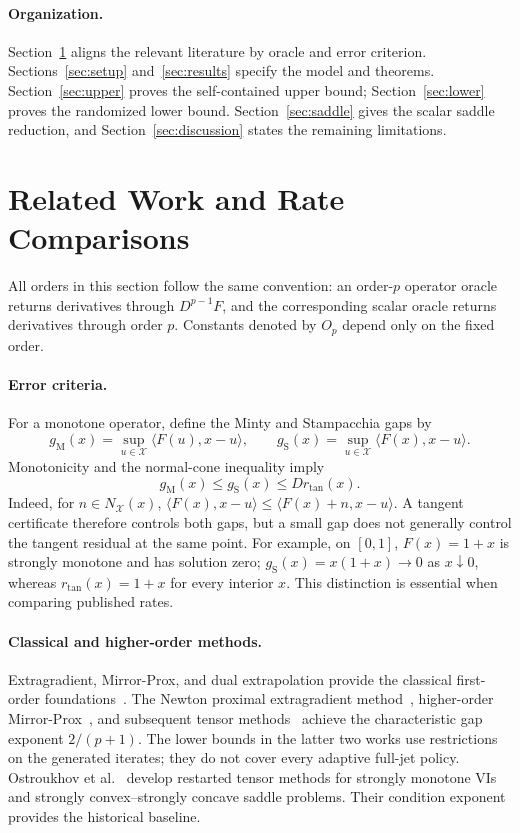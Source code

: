 \documentclass[11pt]{article}
\numberwithin{equation}{section}
\theoremstyle{definition}
\theoremstyle{remark}
\begin{document}
\paragraph{Organization.}
Section~\ref{sec:related} aligns the relevant literature by oracle and
error criterion. Sections~\ref{sec:setup} and~\ref{sec:results} specify
the model and theorems. Section~\ref{sec:upper} proves the self-contained
upper bound; Section~\ref{sec:lower} proves the randomized lower bound.
Section~\ref{sec:saddle} gives the scalar saddle reduction, and
Section~\ref{sec:discussion} states the remaining limitations.

\section{Related Work and Rate Comparisons}\label{sec:related}
All orders in this section follow the same convention: an order-$p$
operator oracle returns derivatives through $D^{p-1}F$, and the
corresponding scalar oracle returns derivatives through order $p$.
Constants denoted by $O_p$ depend only on the fixed order.

\paragraph{Error criteria.}
For a monotone operator, define the Minty and Stampacchia gaps by
\[
g_{\mathrm M}(x)=\sup_{u\in\mathcal X}\langle F(u),x-u\rangle,
\qquad
g_{\mathrm S}(x)=\sup_{u\in\mathcal X}\langle F(x),x-u\rangle.
\]
Monotonicity and the normal-cone inequality imply
\begin{equation}\label{eq:gap-comparison}
g_{\mathrm M}(x)\le g_{\mathrm S}(x)\le D r_{\mathrm{tan}}(x).
\end{equation}
Indeed, for $n\in N_{\mathcal X}(x)$,
$\langle F(x),x-u\rangle\le\langle F(x)+n,x-u\rangle$.
A tangent certificate therefore controls both gaps, but a small gap does
not generally control the tangent residual at the same point. For example,
on $[0,1]$, $F(x)=1+x$ is strongly monotone and has solution zero;
$g_{\mathrm S}(x)=x(1+x)\to0$ as $x\downarrow0$, whereas
$r_{\mathrm{tan}}(x)=1+x$ for every interior $x$. This distinction is
essential when comparing published rates.

\paragraph{Classical and higher-order methods.}
Extragradient, Mirror-Prox, and dual extrapolation provide the classical
first-order foundations~\cite{korpelevich1976,nemirovski2004,nesterov2007}.
The Newton proximal extragradient method~\cite{monteiro2012}, higher-order
Mirror-Prox~\cite{bullins2020}, and subsequent tensor
methods~\cite{adil2022,lin2024} achieve the characteristic gap exponent
$2/(p+1)$. The lower bounds in the latter two works use restrictions on
the generated iterates; they do not cover every adaptive full-jet policy.
Ostroukhov et al.~\cite{ostroukhov2020} develop restarted tensor methods
for strongly monotone VIs and strongly convex--strongly concave saddle
problems. Their condition exponent provides the historical baseline.
\end{document}
